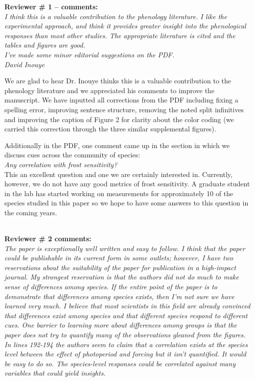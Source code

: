 \documentclass[11pt,a4paper]{article}
\begin{document}
{\bf Reviewer \# 1 -- comments:} \\

\emph{I think this is a valuable contribution to the phenology literature. I like the experimental approach, and think it provides greater insight into the phenological responses than most other studies.  The appropriate literature is cited and the tables and figures are good.\\
I've made some minor editorial suggestions on the PDF.\\
David Inouye}

We are glad to hear Dr. Inouye thinks this is a valuable contribution to the phenology literature and we appreciated his comments to improve the manuscript. We have inputted all corrections from the PDF including fixing a spelling error, improving sentence structure, removing the noted split infinitives and improving the caption of Figure 2 for clarity about the color coding (we carried this correction through the three similar supplemental figures). 

Additionally in the PDF, one comment came up in the section in which we discuss cues across the community of species:\\
\emph{Any correlation with frost sensitivity?}\\

This an excellent question and one we are certainly interested in. Currently, however, we do not have any good metrics of frost sensitivity. A graduate student in the lab has started working on measurements for approximately 10 of the species studied in this paper so we hope to have some answers to this question in the coming years.

\\
{\bf Reviewer \# 2 comments:} \\

\emph{The paper is exceptionally well written and easy to follow. I think that the paper could be
publishable in its current form in some outlets; however, I have two reservations about the
suitability of the paper for publication in a high-impact journal. My strongest reservation
is that the authors did not do much to make sense of differences among species. If the entire
point of the paper is to demonstrate that differences among species exists, then I'm not sure
we have learned very much. I believe that most scientists in this field are already convinced
that differences exist among species and that different species respond to different cues. One barrier to learning more about differences among groups is that the paper does not try to quantify many of the observations gleaned from the figures. In lines 192-194 the authors seem
to claim that a correlation exists at the species level between the effect of photoperiod and
forcing but it isn't quantified. It would be easy to do so. The species-level responses could be correlated against many variables that could yield insights.}\\
\end{document}
